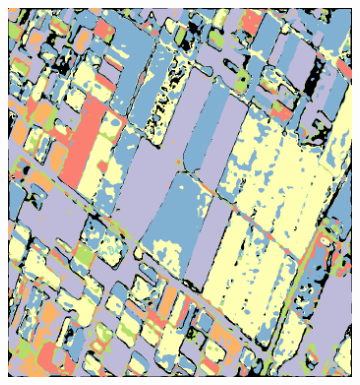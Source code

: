 \begin{figure}[tbp]
\begin{subfigure}[b]{0.45\textwidth}
        \caption{}
        \label{fig:C}
    \end{subfigure}
    \begin{subfigure}[b]{0.45\textwidth}
        \includegraphics[width=\textwidth]{Figures/Kron/Ls_COLOUR}
        \caption{}
        \label{fig:L}
    \end{subfigure}
    \begin{subfigure}[b]{0.45\textwidth}

\end{subfigure}
\end{figure}
